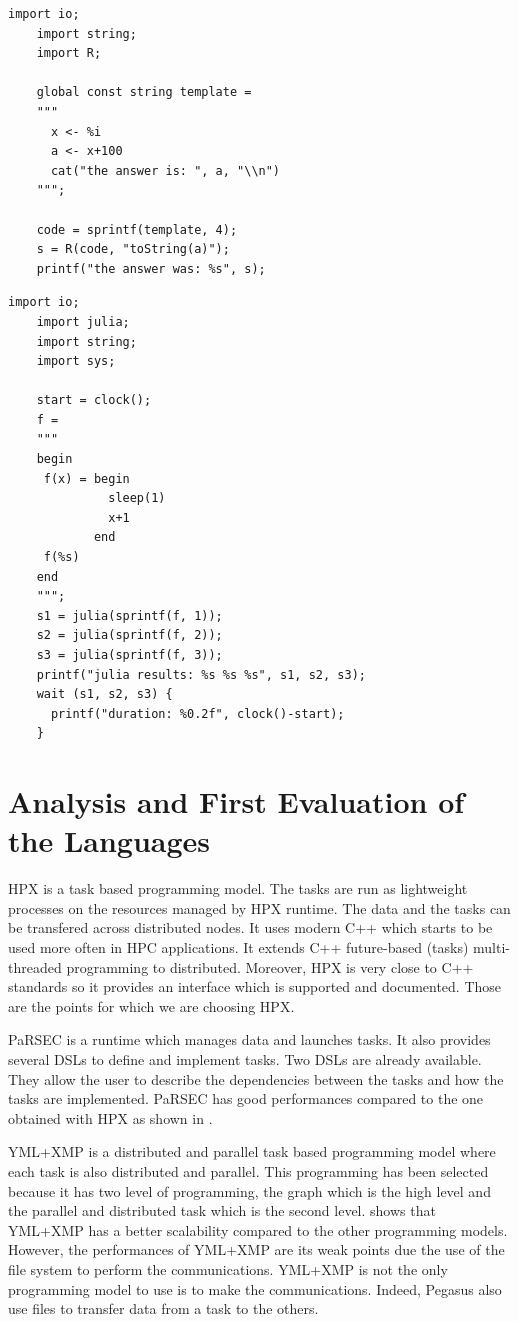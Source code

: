 \begin{enumerate}
	\begin{lstlisting}[basicstyle=\ttfamily, tabsize=3, frame=single, caption=Call of R code by a Swift application\label{lst:swift_Rswift}]
	import io;
	import string;
	import R;

	global const string template =
	"""
	  x <- %i
	  a <- x+100
	  cat("the answer is: ", a, "\\n")
	""";

	code = sprintf(template, 4);
	s = R(code, "toString(a)");
	printf("the answer was: %s", s);
	\end{lstlisting}


	\begin{lstlisting}[basicstyle=\ttfamily, tabsize=3, frame=single, caption=Call of  Julia code by a Swift application\label{lst:swift_juliaswift}]
	import io;
	import julia;
	import string;
	import sys;

	start = clock();
	f =
	"""
	begin
	 f(x) = begin
	          sleep(1)
	          x+1
	        end
	 f(%s)
	end
	""";
	s1 = julia(sprintf(f, 1));
	s2 = julia(sprintf(f, 2));
	s3 = julia(sprintf(f, 3));
	printf("julia results: %s %s %s", s1, s2, s3);
	wait (s1, s2, s3) {
	  printf("duration: %0.2f", clock()-start);
	}
	\end{lstlisting}
\end{enumerate}

\section{Analysis and First Evaluation of the Languages}

HPX is a task based programming model.
The tasks are run as lightweight processes on the resources managed by HPX runtime.
The data and the tasks can be transfered across distributed nodes.
It uses modern C++ which starts to be used more often in HPC applications.
It extends C++ future-based (tasks) multi-threaded programming to distributed.
Moreover, HPX is very close to C++ standards so it provides an interface which is supported and documented.
Those are the points for which we are choosing HPX.

PaRSEC is a runtime which manages data and launches tasks.
It also provides several DSLs to define and implement tasks.
Two DSLs are already available.
They allow the user to describe the dependencies between the tasks and how the tasks are implemented.
PaRSEC has good performances compared to the one obtained with HPX as shown in \cite{GurhP2020} .

YML+XMP is a distributed and parallel task based programming model where each task is also distributed and parallel.
This programming has been selected because it has two level of programming, the graph which is the high level and the parallel and distributed task which is the second level.
\cite{GurhP2020} shows that YML+XMP has a better scalability compared to the other programming models.
However, the performances of YML+XMP are its weak points due the use of the file system to perform the communications.
YML+XMP is not the only programming model to use is to make the communications.
Indeed, Pegasus also use files to transfer data from a task to the others.

